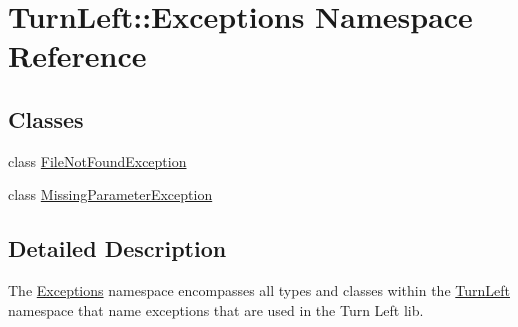 \hypertarget{namespaceTurnLeft_1_1Exceptions}{
\section{TurnLeft::Exceptions Namespace Reference}
\label{namespaceTurnLeft_1_1Exceptions}
}
\subsection*{Classes}
\begin{DoxyCompactItemize}
\item 
class \hyperlink{classTurnLeft_1_1Exceptions_1_1FileNotFoundException}{FileNotFoundException}
\item 
class \hyperlink{classTurnLeft_1_1Exceptions_1_1MissingParameterException}{MissingParameterException}
\end{DoxyCompactItemize}


\subsection{Detailed Description}
The \hyperlink{namespaceTurnLeft_1_1Exceptions}{Exceptions} namespace encompasses all types and classes within the \hyperlink{namespaceTurnLeft}{TurnLeft} namespace that name exceptions that are used in the Turn Left lib. 